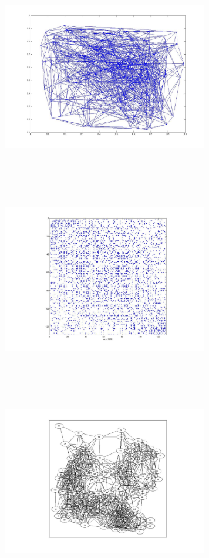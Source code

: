 \includegraphics[width=9.0cm,height=9.0cm]{images/GraphTheory/hypercube_8_Dimension.jpg}
\includegraphics[width=9.0cm,height=9.0cm]{images/GraphTheory/RandomGraphAdjacencyMatrix_WithCut_jpg.jpg}
\includegraphics[width=9.0cm,height=9.0cm]{images/GraphTheory/RandomGraphOptimalEdgeInputGraph_AdjacencyMatrix.jpg}
